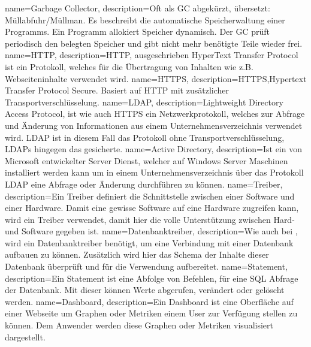 {
  name=Garbage Collector,
  description={Oft als GC abgekürzt, übersetzt: Müllabfuhr/Müllman. Es
               beschreibt die automatische Speicherwaltung einer Programms.
               Ein Programm allokiert Speicher dynamisch. Der GC prüft
               periodisch den belegten Speicher und gibt nicht mehr benötigte
               Teile wieder frei.}
}
{
  name=HTTP,
  description={HTTP, ausgeschrieben HyperText Transfer Protocol ist ein
              Protokoll, welches für die Übertragung von Inhalten wie z.B.
              Webseiteninhalte verwendet wird.}
}
{
  name=HTTPS,
  description={HTTPS,Hypertext Transfer Protocol Secure. Basiert auf
              \gls{HTTP} mit zusätzlicher Transportverschlüsselung.}
}
{
  name=LDAP,
  description={Lightweight Directory Access Protocol, ist wie auch \gls{HTTPS}
            ein Netzwerkprotokoll, welches zur Abfrage und Änderung von
            Informationen aus einem Unternehmensverzeichnis verwendet wird.
            LDAP ist in diesem Fall das Protokoll ohne Transportverschlüsselung,
            LDAPs hingegen das gesicherte.}
}
{
  name=Active Directory,
  description={Ist ein von Microsoft entwickelter Server Dienst, welcher auf
              Windows Server Maschinen installiert werden kann um in einem
              Unternehmensverzeichnis über das Protokoll \gls{LDAP} eine
              Abfrage oder Änderung durchführen zu können.}
}
{
  name=Treiber,
  description={Ein Treiber definiert die Schnittstelle zwischen einer
              Software und einer Hardware. Damit eine gewisse Software auf
              eine Hardware zugreifen kann, wird ein Treiber verwendet,
              damit hier die volle Unterstützung zwischen Hard- und Software
              gegeben ist.}
}
{
  name=Datenbanktreiber,
  description={Wie auch bei , wird ein
              Datenbanktreiber benötigt, um eine Verbindung mit einer
              Datenbank aufbauen zu können. Zusätzlich wird hier
              das Schema der Inhalte dieser Datenbank überprüft und
              für die Verwendung aufbereitet.}
}
{
  name=Statement,
  description={Ein Statement ist eine Abfolge von Befehlen, für eine \gls{SQL}
              Abfrage der Datenbank. Mit dieser können Werte abgerufen,
              verändert oder gelöscht werden.}
}
{
  name=Dashboard,
  description={Ein Dashboard ist eine Oberfläche auf einer Webseite um Graphen
              oder Metriken einem User zur Verfügung stellen zu können. Dem
              Anwender werden diese Graphen oder Metriken visualisiert dargestellt.}
}
